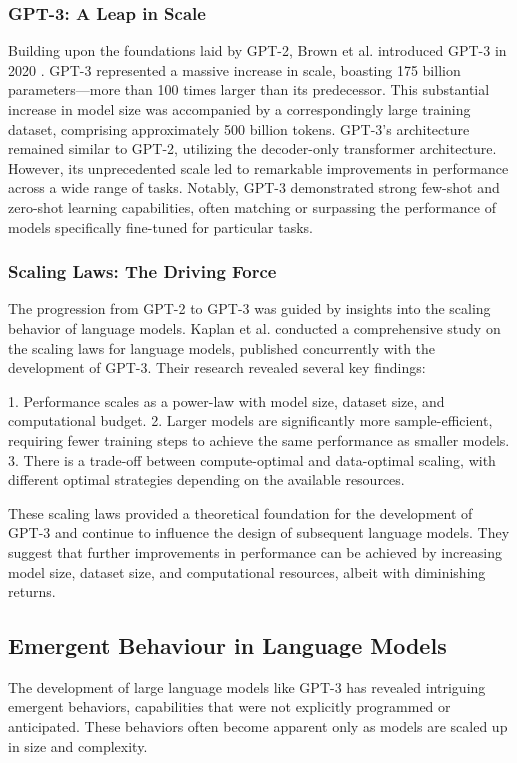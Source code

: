 \documentclass[a4paper, oneside]{discothesis}
\begin{document}
\subsubsection{GPT-3: A Leap in Scale}
Building upon the foundations laid by GPT-2, Brown et al. introduced GPT-3 in 2020 \cite{brown2020language}. 
GPT-3 represented a massive increase in scale, boasting 175 billion parameters—more than 100 times larger than its predecessor. 
This substantial increase in model size was accompanied by a correspondingly large training dataset, comprising approximately 500 billion tokens.
GPT-3's architecture remained similar to GPT-2, utilizing the decoder-only transformer architecture. 
However, its unprecedented scale led to remarkable improvements in performance across a wide range of tasks. Notably, GPT-3 demonstrated strong few-shot and zero-shot learning capabilities, often matching or surpassing the performance of models specifically fine-tuned for particular tasks.

\subsubsection{Scaling Laws: The Driving Force}
The progression from GPT-2 to GPT-3 was guided by insights into the scaling behavior of language models. Kaplan et al. \cite{kaplan2020scaling} conducted a comprehensive study on the scaling laws for language models, published concurrently with the development of GPT-3. Their research revealed several key findings:

1. Performance scales as a power-law with model size, dataset size, and computational budget.
2. Larger models are significantly more sample-efficient, requiring fewer training steps to achieve the same performance as smaller models.
3. There is a trade-off between compute-optimal and data-optimal scaling, with different optimal strategies depending on the available resources.

These scaling laws provided a theoretical foundation for the development of GPT-3 and continue to influence the design of subsequent language models. They suggest that further improvements in performance can be achieved by increasing model size, dataset size, and computational resources, albeit with diminishing returns.

\subsection{Emergent Behaviour in Language Models}
The development of large language models like GPT-3 has revealed intriguing emergent behaviors, capabilities that were not explicitly programmed or anticipated. These behaviors often become apparent only as models are scaled up in size and complexity.
\end{document}
